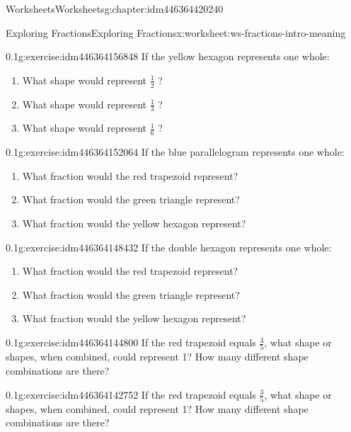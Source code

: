 \documentclass[twoside,11pt,]{book}
\begin{document}
\begin{chapterptx}{Worksheets}{}{Worksheets}{}{}{g:chapter:idm446364420240}
\begin{worksheet-section-numberless}{Exploring Fractions}{}{Exploring Fractions}{}{}{x:worksheet:ws-fractions-intro-meaning}
\begin{divisionexercise}{4}{}{0.1}{g:exercise:idm446364156848}%
If the yellow hexagon represents one whole:%
%
\begin{enumerate}[label=(\alph*)]
\item{}What shape would represent \(\frac{1}{2} \) ?%
\item{}What shape would represent \(\frac{1}{3} \) ?%
\item{}What shape would represent \(\frac{1}{6} \) ?%
\end{enumerate}
\end{divisionexercise}%
\begin{divisionexercise}{5}{}{0.1}{g:exercise:idm446364152064}%
If the blue parallelogram represents one whole:%
%
\begin{enumerate}[label=(\alph*)]
\item{}What fraction would the red trapezoid represent?%
\item{}What fraction would the green triangle represent?%
\item{}What fraction would the yellow hexagon represent?%
\end{enumerate}
\end{divisionexercise}%
\begin{divisionexercise}{6}{}{0.1}{g:exercise:idm446364148432}%
If the double hexagon represents one whole:%
%
\begin{enumerate}[label=(\alph*)]
\item{}What fraction would the red trapezoid represent?%
\item{}What fraction would the green triangle represent?%
\item{}What fraction would the yellow hexagon represent?%
\end{enumerate}
\end{divisionexercise}%
\begin{divisionexercise}{7}{}{0.1}{g:exercise:idm446364144800}%
If the red trapezoid equals \(\frac{3}{5} \), what shape or shapes, when combined, could represent 1?  How many different shape combinations are there?%
\end{divisionexercise}%
\begin{divisionexercise}{8}{}{0.1}{g:exercise:idm446364142752}%
If the red trapezoid equals \(\frac{3}{5} \), what shape or shapes, when combined, could represent 1?  How many different shape combinations are there?%
\end{divisionexercise}%
\begin{introduction}{}%

\end{introduction}
\end{worksheet-section-numberless}
\end{chapterptx}
\end{document}
